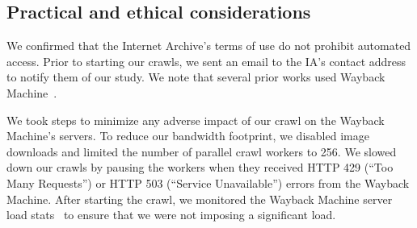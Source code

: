 \subsection{Practical and ethical considerations}
\label{subsec:ppot:practical-matters}
We confirmed that the Internet Archive’s terms of use do not prohibit automated access. Prior to starting our crawls, we sent an email to the IA’s contact address to notify them of our study.
We note that several prior works used Wayback Machine~\cite{lerner2016internet, lerner2017rewriting,brunelle2015not,brunelle2016impact}.

We took steps to minimize any adverse impact of our crawl on the Wayback Machine’s servers.
To reduce our bandwidth footprint, we disabled image downloads and limited the number of parallel crawl workers to 256.
We slowed down our crawls by pausing the workers when they received HTTP 429 (``Too Many Requests'') or HTTP 503 (``Service Unavailable'') errors from the Wayback Machine. 
After starting the crawl, we monitored the Wayback Machine server load stats~\cite{Wayback-Stats} to ensure that we were not imposing a significant load.

